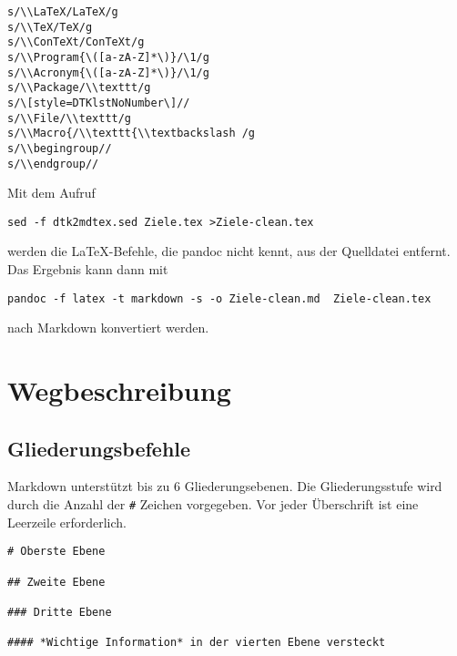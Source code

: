 \documentclass[11pt,ngerman,a4paper]{article}
\begin{document}
\begin{verbatim}
s/\\LaTeX/LaTeX/g
s/\\TeX/TeX/g
s/\\ConTeXt/ConTeXt/g
s/\\Program{\([a-zA-Z]*\)}/\1/g
s/\\Acronym{\([a-zA-Z]*\)}/\1/g
s/\\Package/\\texttt/g
s/\[style=DTKlstNoNumber\]//
s/\\File/\\texttt/g
s/\\Macro{/\\texttt{\\textbackslash /g
s/\\begingroup//
s/\\endgroup//
\end{verbatim}

Mit dem Aufruf

\begin{verbatim}
sed -f dtk2mdtex.sed Ziele.tex >Ziele-clean.tex
\end{verbatim}

werden die LaTeX-Befehle, die pandoc nicht kennt, aus der Quelldatei
entfernt. Das Ergebnis kann dann mit

\begin{verbatim}
pandoc -f latex -t markdown -s -o Ziele-clean.md  Ziele-clean.tex
\end{verbatim}

nach Markdown konvertiert werden.

\section{Wegbeschreibung}\label{wegbeschreibung}

\subsection{Gliederungsbefehle}\label{gliederungsbefehle}

Markdown unterstützt bis zu 6 Gliederungsebenen. Die Gliederungsstufe
wird durch die Anzahl der \texttt{\#} Zeichen vorgegeben. Vor jeder
Überschrift ist eine Leerzeile erforderlich.

\begin{verbatim}
# Oberste Ebene

## Zweite Ebene

### Dritte Ebene

#### *Wichtige Information* in der vierten Ebene versteckt
\end{verbatim}
\end{document}
